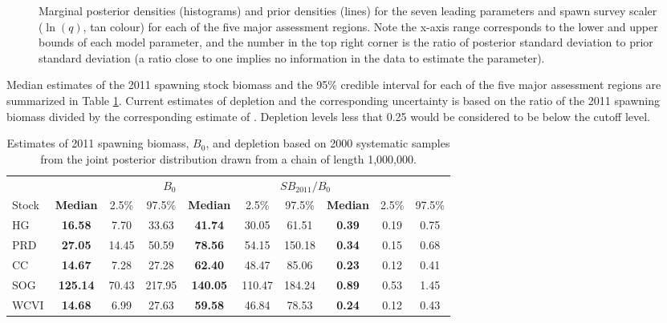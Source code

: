 \begin{figure}[!tbp]

	\caption{Marginal posterior densities (histograms) and prior densities (lines) for the seven leading parameters and spawn survey scaler ($\ln(q)$, tan colour) for each of the five major assessment regions. Note the x-axis range corresponds to the lower and upper bounds of each model parameter, and the number in the top right corner is the ratio of posterior standard deviation to prior standard deviation (a ratio close to one implies no information in the data to estimate the parameter).}\label{PartII:MCMC:Marginals}
\end{figure}

Median estimates of the 2011 spawning stock biomass and the 95\% credible interval for each of the five major assessment regions are summarized in Table \ref{table:2011_SB_Depletion}.  Current estimates of depletion and the corresponding uncertainty is based on the ratio of the 2011 spawning biomass divided by the corresponding estimate of \bo.  Depletion levels less that 0.25 would be considered to be below the cutoff level.

\begin{table}
	\caption{Estimates of 2011 spawning biomass, $B_0$, and depletion based on 2000 systematic samples from the joint posterior distribution drawn from a chain of length 1,000,000.\label{table:2011_SB_Depletion}}
	\begin{center}
	\begin{small}
	\begin{tabular}{l>{\bfseries}ccc|>{\bfseries}ccc|>{\bfseries}ccc}
	\hline 
	&\multicolumn{3}{c}{$SB_{2011}$} 
	&\multicolumn{3}{c}{$B_0$} 
	&\multicolumn{3}{c}{$SB_{2011}/B_0$}\\
	Stock 
	&Median & 2.5\% & 97.5\%
	&Median & 2.5\% & 97.5\%
	&Median & 2.5\% & 97.5\% \\
	\hline
	HG & 16.58 & 7.70 &33.63& 41.74 &30.05 &61.51&  0.39  &0.19  &0.75 \\
	PRD & 27.05 & 14.45&  50.59 & 78.56 & 54.15 &150.18 &  0.34  & 0.15  & 0.68\\
	CC & 14.67 & 7.28 &27.28 &62.40& 48.47& 85.06 & 0.23 & 0.12 & 0.41\\
	SOG & 125.14 & 70.43& 217.95 &140.05& 110.47& 184.24 &  0.89 &  0.53 &  1.45\\
	WCVI & 14.68 & 6.99 &27.63& 59.58& 46.84& 78.53&  0.24 & 0.12&  0.43\\
	\hline
	\end{tabular}
	\end{small}
	\end{center}
\end{table}


